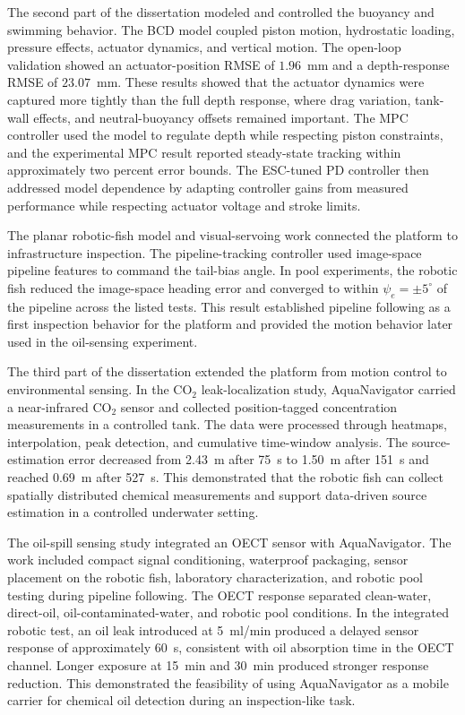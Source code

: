\documentclass{uhcoethesis}
\begin{document}
The second part of the dissertation modeled and controlled the buoyancy and swimming behavior. The BCD model coupled piston motion, hydrostatic loading, pressure effects, actuator dynamics, and vertical motion. The open-loop validation showed an actuator-position RMSE of $1.96$~mm and a depth-response RMSE of $23.07$~mm. These results showed that the actuator dynamics were captured more tightly than the full depth response, where drag variation, tank-wall effects, and neutral-buoyancy offsets remained important. The MPC controller used the model to regulate depth while respecting piston constraints, and the experimental MPC result reported steady-state tracking within approximately two percent error bounds. The ESC-tuned PD controller then addressed model dependence by adapting controller gains from measured performance while respecting actuator voltage and stroke limits.

The planar robotic-fish model and visual-servoing work connected the platform to infrastructure inspection. The pipeline-tracking controller used image-space pipeline features to command the tail-bias angle. In pool experiments, the robotic fish reduced the image-space heading error and converged to within $\psi_e=\pm 5^\circ$ of the pipeline across the listed tests. This result established pipeline following as a first inspection behavior for the platform and provided the motion behavior later used in the oil-sensing experiment.

The third part of the dissertation extended the platform from motion control to environmental sensing. In the \mbox{CO$_2$} leak-localization study, AquaNavigator carried a near-infrared \mbox{CO$_2$} sensor and collected position-tagged concentration measurements in a controlled tank. The data were processed through heatmaps, interpolation, peak detection, and cumulative time-window analysis. The source-estimation error decreased from 2.43~m after 75~s to 1.50~m after 151~s and reached 0.69~m after 527~s. This demonstrated that the robotic fish can collect spatially distributed chemical measurements and support data-driven source estimation in a controlled underwater setting.

The oil-spill sensing study integrated an OECT sensor with AquaNavigator. The work included compact signal conditioning, waterproof packaging, sensor placement on the robotic fish, laboratory characterization, and robotic pool testing during pipeline following. The OECT response separated clean-water, direct-oil, oil-contaminated-water, and robotic pool conditions. In the integrated robotic test, an oil leak introduced at 5~ml/min produced a delayed sensor response of approximately 60~s, consistent with oil absorption time in the OECT channel. Longer exposure at 15~min and 30~min produced stronger response reduction. This demonstrated the feasibility of using AquaNavigator as a mobile carrier for chemical oil detection during an inspection-like task.
\end{document}
